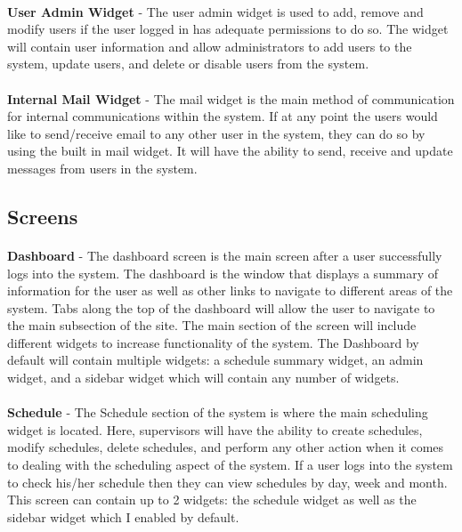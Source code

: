 \documentclass[letterpaper,12pt]{report}
\begin{document}
\paragraph*{}\hspace{0.6cm}\textbf{User Admin Widget} - The user admin widget is used to add, remove and modify users if the user logged in has adequate permissions to do so. The widget will contain user information and allow administrators to add users to the system, update users, and delete or disable users from the system.
\paragraph*{}\hspace{0.6cm}\textbf{Internal Mail Widget} - The mail widget is the main method of communication for internal communications within the system. If at any point the users would like to send/receive email to any other user in the system, they can do so by using the built in mail widget. It will have the ability to send, receive and update messages from users in the system.

\subsection{Screens}
\paragraph*{}\hspace{0.6cm}\textbf{Dashboard} - The dashboard screen is the main screen after a user successfully logs into the system. The dashboard is the window that displays a summary of information for the user as well as other links to navigate to different areas of the system. Tabs along the top of the dashboard will allow the user to navigate to the main subsection of the site. The main section of the screen will include different widgets to increase functionality of the system. The Dashboard by default will contain multiple widgets: a schedule summary widget, an admin widget, and a sidebar widget which will contain any number of widgets.
\pagebreak
\paragraph*{}\hspace{0.6cm}\textbf{Schedule} - The Schedule section of the system is where the main scheduling widget is located. Here, supervisors will have the ability to create schedules, modify schedules, delete schedules, and perform any other action when it comes to dealing with the scheduling aspect of the system. If a user logs into the system to check his/her schedule then they can view schedules by day, week and month. This screen can contain up to 2 widgets: the schedule widget as well as the sidebar widget which I enabled by default.
\end{document}
